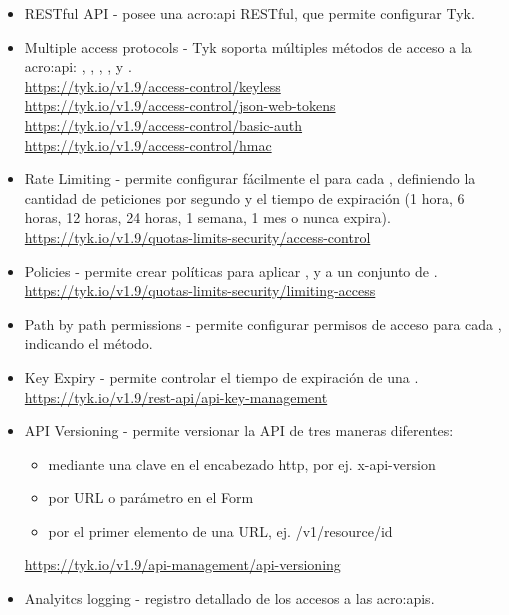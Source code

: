 \begin{itemize}
  \item RESTful API - posee una \gls{acro:api} RESTful, que permite configurar Tyk.
  \item Multiple access protocols - Tyk soporta múltiples métodos de acceso a la \gls{acro:api}: , , , ,  y . \\
  \url{https://tyk.io/v1.9/access-control/keyless} \\
  \url{https://tyk.io/v1.9/access-control/json-web-tokens} \\
  \url{https://tyk.io/v1.9/access-control/basic-auth} \\
  \url{https://tyk.io/v1.9/access-control/hmac} \\
  \item Rate Limiting - permite configurar fácilmente el  para cada , definiendo la cantidad de peticiones por segundo y el tiempo de expiración (1 hora, 6 horas, 12 horas, 24 horas, 1 semana, 1 mes o nunca expira). \\
  \url{https://tyk.io/v1.9/quotas-limits-security/access-control}
  \item Policies - permite crear políticas para aplicar ,  y  a un conjunto de . \\
  \url{https://tyk.io/v1.9/quotas-limits-security/limiting-access}
  \item Path by path permissions - permite configurar permisos de acceso para cada , indicando el método.
  \item Key Expiry - permite controlar el tiempo de expiración de una . \\
  \url{https://tyk.io/v1.9/rest-api/api-key-management}
  \item API Versioning - permite versionar la API de tres maneras diferentes:
  \begin{itemize}
    \item mediante una clave en el encabezado http, por ej. x-api-version
    \item por URL o parámetro en el Form
    \item por el primer elemento de una URL, ej. /v1/resource/id
  \end{itemize}
  \url{https://tyk.io/v1.9/api-management/api-versioning}
  \item Analyitcs logging - registro detallado de los accesos a las \glspl{acro:api}.

\end{itemize}
